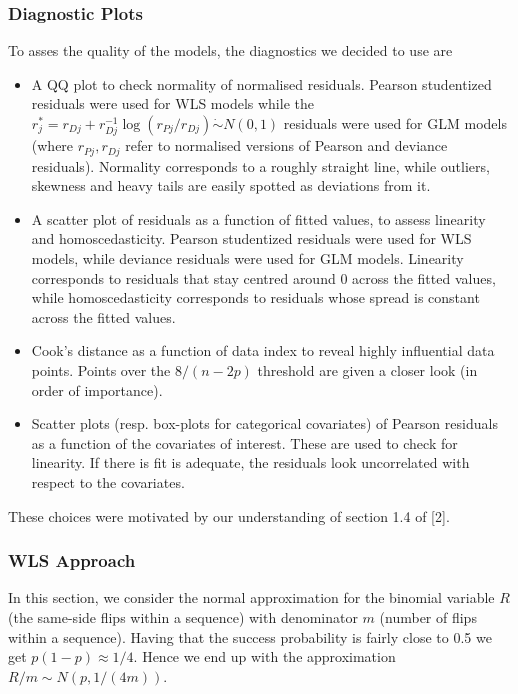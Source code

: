 \documentclass[a4paper, 12pt,oneside]{article}
\begin{document}
			\subsubsection{Diagnostic Plots}
				To asses the quality of the models, the diagnostics we decided to use are 
				\begin{itemize}
					\item A QQ plot to check normality of normalised residuals. Pearson studentized residuals were used for WLS models while the $r_j^*=r_{D j}+r_{D j}^{-1} \log \left(r_{P j} / r_{D j}\right) \dot{\sim} N(0,1)$ residuals were used for GLM models (where $r_{P j},r_{D j}$ refer to normalised versions of Pearson and deviance residuals). Normality corresponds to a roughly straight line, while outliers, skewness and heavy tails are easily spotted as deviations from it.
					\item A scatter plot of residuals as a function of fitted values, to assess linearity and homoscedasticity. Pearson studentized residuals were used for WLS models, while deviance residuals were used for GLM models. Linearity corresponds to residuals that stay centred around 0 across the fitted values, while homoscedasticity corresponds to residuals whose spread is constant across the fitted values.
					\item Cook's distance as a function of data index to reveal highly influential data points. Points over the $8/(n-2p)$ threshold are given a closer look (in order of importance). 
					\item Scatter plots (resp. box-plots for categorical covariates) of Pearson residuals as a function of the covariates of interest. These are used to check for linearity. If there is fit is adequate, the residuals look uncorrelated with respect to the covariates. 
				\end{itemize}
				These choices were motivated by our understanding of section 1.4 of [2]. 
			\subsubsection{WLS Approach}
			In this section, we consider the normal approximation for the binomial variable $R$ (the same-side flips within a sequence) with denominator $m$ (number of flips within a sequence). 
			Having that the success probability is fairly close to 0.5 we get $p(1-p)\approx1/4$. Hence we end up with the approximation $R/m \sim N(p,1/(4m))$. 
			
\end{document}
